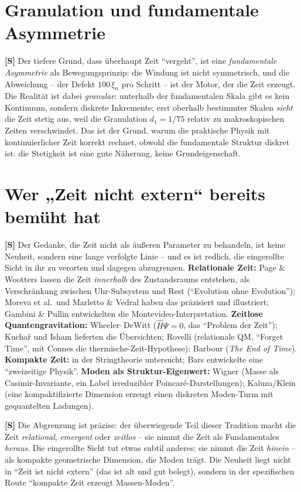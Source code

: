 \section{Granulation und fundamentale Asymmetrie}

\textbf{[S]} Der tiefere Grund, dass überhaupt Zeit \enquote{vergeht}, ist eine
\emph{fundamentale Asymmetrie} als Bewegungsprinzip: die Windung ist nicht
symmetrisch, und die Abweichung -- der Defekt $100\,\xi_n$ pro Schritt -- ist der
Motor, der die Zeit erzeugt. Die Realität ist dabei \emph{granular}: unterhalb der
fundamentalen Skala gibt es kein Kontinuum, sondern diskrete Inkremente; erst
oberhalb bestimmter Skalen \emph{sieht} die Zeit stetig aus, weil die Granulation
$d_1=1/75$ relativ zu makroskopischen Zeiten verschwindet. Das ist der Grund,
warum die praktische Physik mit kontinuierlicher Zeit korrekt rechnet, obwohl die
fundamentale Struktur diskret ist: die Stetigkeit ist eine gute Näherung, keine
Grundeigenschaft.

\section{Wer „Zeit nicht extern`` bereits bemüht hat}

\textbf{[S]} Der Gedanke, die Zeit nicht als äußeren Parameter zu behandeln, ist
keine Neuheit, sondern eine lange verfolgte Linie -- und es ist redlich, die
eingerollte Sicht in ihr zu verorten und dagegen abzugrenzen. \textbf{Relationale
Zeit:} Page \& Wootters lassen die Zeit \emph{innerhalb} des Zustandsraums
entstehen, als Verschränkung zwischen Uhr-Subsystem und Rest (\enquote{Evolution
ohne Evolution}); Moreva et al.\ und Marletto \& Vedral haben das präzisiert und
illustriert; Gambini \& Pullin entwickelten die Montevideo-Interpretation.
\textbf{Zeitlose Quantengravitation:} Wheeler--DeWitt ($\hat H\Psi=0$, das
\enquote{Problem der Zeit}); Kuchař und Isham lieferten die Übersichten; Rovelli
(relationale QM, \enquote{Forget Time}, mit Connes die thermische-Zeit-Hypothese);
Barbour (\emph{The End of Time}). \textbf{Kompakte Zeit:} in der Stringtheorie
untersucht; Bars entwickelte eine \enquote{zweizeitige Physik}. \textbf{Moden als
Struktur-Eigenwert:} Wigner (Masse als Casimir-Invariante, ein Label
irreduzibler Poincaré-Darstellungen); Kaluza/Klein (eine kompaktifizierte
Dimension erzeugt einen diskreten Moden-Turm mit gequantelten Ladungen).

\textbf{[S]} Die Abgrenzung ist präzise: der überwiegende Teil dieser Tradition
macht die Zeit \emph{relational}, \emph{emergent} oder \emph{zeitlos} -- sie nimmt
die Zeit als Fundamentales \emph{heraus}. Die eingerollte Sicht tut etwas subtil
anderes: sie nimmt die Zeit \emph{hinein} -- als kompakte geometrische Dimension,
die Moden trägt. Die Neuheit liegt nicht in \enquote{Zeit ist nicht extern} (das
ist alt und gut belegt), sondern in der spezifischen Route \enquote{kompakte Zeit
erzeugt Massen-Moden}.

